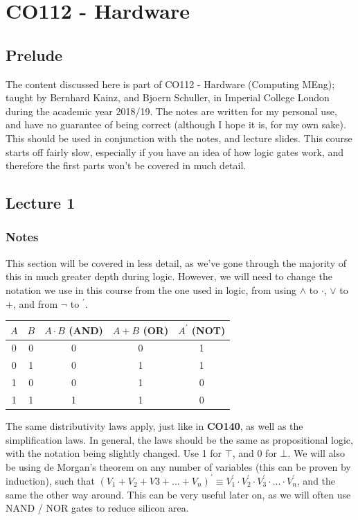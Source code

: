 \documentclass[a4paper, 12pt]{article}
\begin{document}
    \section*{CO112 - Hardware}
        \subsection*{Prelude}
            The content discussed here is part of CO112 - Hardware (Computing MEng); taught by Bernhard Kainz, and Bjoern Schuller, in Imperial College London during the academic year 2018/19. The notes are written for my personal use, and have no guarantee of being correct (although I hope it is, for my own sake). This should be used in conjunction with the notes, and lecture slides. This course starts off fairly slow, especially if you have an idea of how logic gates work, and therefore the first parts won't be covered in much detail.
        \subsection*{Lecture 1}
            \subsubsection*{Notes}
                This section will be covered in less detail, as we've gone through the majority of this in much greater depth during logic. However, we will need to change the notation we use in this course from the one used in logic, from using $\land$ to $\cdot$, $\lor$ to $+$, and from $\neg$ to $^\prime$.
                \begin{center}
                    \begin{tabular}{cc|c|c|c}
                        $A$ & $B$ & $A \cdot B$ (AND) & $A + B$ (OR) & $A^\prime$ (NOT) \\
                        \hline
                        0 & 0 & 0 & 0 & 1 \\
                        0 & 1 & 0 & 1 & 1 \\
                        1 & 0 & 0 & 1 & 0 \\
                        1 & 1 & 1 & 1 & 0
                    \end{tabular}
                \end{center}
                The same distributivity laws apply, just like in \textbf{CO140}, as well as the simplification laws. In general, the laws should be the same as propositional logic, with the notation being slightly changed. Use 1 for $\top$, and 0 for $\bot$. We will also be using de Morgan's theorem on any number of variables (this can be proven by induction), such that $(V_1 + V_2 + V3 + ... + V_n)^\prime \equiv V_1^\prime \cdot V_2^\prime \cdot V_3^\prime \cdot ... \cdot V_n^\prime$, and the same the other way around. This can be very useful later on, as we will often use NAND / NOR gates to reduce silicon area.
\end{document}
